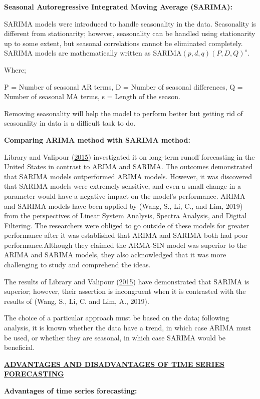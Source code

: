 \documentclass[12pt,a4paper]{book}
\begin{document}
{\textbf{Seasonal Autoregressive Integrated Moving Average (SARIMA):}

SARIMA models were introduced to handle seasonality in the data.
Seasonality is different from stationarity; however, seasonality can be
handled using stationarity up to some extent, but seasonal correlations
cannot be eliminated completely. SARIMA models are mathematically
written as SARIMA\((p,d,q)(P,D,Q)^{s}\).

Where;

P = Number of seasonal AR terms, D = Number of seasonal differences, Q =
Number of seasonal MA terms, s = Length of the season.

Removing seasonality will help the model to perform better but getting
rid of seasonality in data is a difficult task to do.

\textbf{Comparing ARIMA method with SARIMA method:}

Library and Valipour (\protect\hyperlink{ref-library2015}{2015})
investigated it on long-term runoff forecasting in the United States in
contrast to ARIMA and SARIMA. The outcomes demonstrated that SARIMA
models outperformed ARIMA models. However, it was discovered that SARIMA
models were extremely sensitive, and even a small change in a parameter
would have a negative impact on the model's performance. ARIMA and
SARIMA models have been applied by (Wang, S., Li, C., and Lim, 2019)
from the perspectives of Linear System Analysis, Spectra Analysis, and
Digital Filtering. The researchers were obliged to go outside of these
models for greater performance after it was established that ARIMA and
SARIMA both had poor performance.Although they claimed the ARMA-SIN
model was superior to the ARIMA and SARIMA models, they also
acknowledged that it was more challenging to study and comprehend the
ideas.

The results of Library and Valipour
(\protect\hyperlink{ref-library2015}{2015}) have demonstrated that
SARIMA is superior; however, their assertion is incongruent when it is
contrasted with the results of (Wang, S., Li, C. and Lim, A., 2019).

The choice of a particular approach must be based on the data; following
analysis, it is known whether the data have a trend, in which case ARIMA
must be used, or whether they are seasonal, in which case SARIMA would
be beneficial.

\textsc{\uline{\textbf{ADVANTAGES AND DISADVANTAGES OF TIME SERIES
FORECASTING}}}

\textbf{Advantages of time series forecasting:}

}
\end{document}

